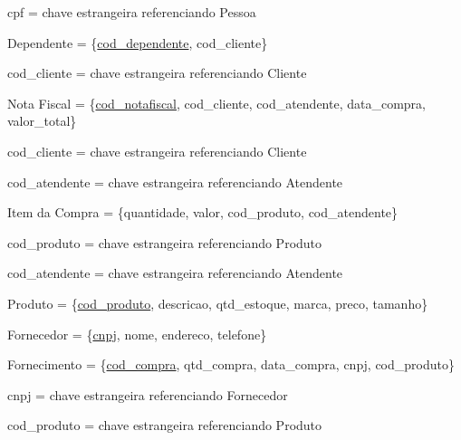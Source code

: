 \documentclass[a4paper,12pt]{article}
\begin{document}
	cpf = chave estrangeira referenciando Pessoa
	
	\begin{flushleft}
		Dependente = \{\uline{cod\_dependente}, cod\_cliente\}
	\end{flushleft}
	
	cod\_cliente = chave estrangeira referenciando Cliente
	
	\begin{flushleft}
		Nota Fiscal = \{\uline{cod\_notafiscal}, cod\_cliente, cod\_atendente, data\_compra, valor\_total\}
	\end{flushleft}
	
	cod\_cliente = chave estrangeira referenciando Cliente
	
	cod\_atendente = chave estrangeira referenciando Atendente
	
	\begin{flushleft}
		Item da Compra = \{quantidade, valor, cod\_produto, cod\_atendente\}
	\end{flushleft}
	
	cod\_produto = chave estrangeira referenciando Produto
	
	cod\_atendente = chave estrangeira referenciando Atendente
	
	\begin{flushleft}
		Produto = \{\uline{cod\_produto}, descricao, qtd\_estoque, marca, preco, tamanho\}
	\end{flushleft}
	
	\begin{flushleft}
		Fornecedor = \{\uline{cnpj}, nome, endereco, telefone\}
	\end{flushleft}
	
	\begin{flushleft}
		Fornecimento = \{\uline{cod\_compra}, qtd\_compra, data\_compra, cnpj, cod\_produto\}
	\end{flushleft}
	
	cnpj = chave estrangeira referenciando Fornecedor
	
	cod\_produto = chave estrangeira referenciando Produto
	
	
\end{document}
